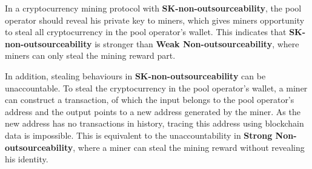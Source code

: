 In a cryptocurrency mining protocol with \textbf{SK-non-outsourceability}, the pool operator should reveal his private key to miners, which gives miners opportunity to steal all cryptocurrency in the pool operator's wallet.
This indicates that \textbf{SK-non-outsourceability} is stronger than \textbf{Weak Non-outsourceability}, where miners can only steal the mining reward part.

In addition, stealing behaviours in \textbf{SK-non-outsourceability} can be unaccountable.
To steal the cryptocurrency in the pool operator's wallet, a miner can construct a transaction, of which the input belongs to the pool operator's address and the output points to a new address generated by the miner.
As the new address has no transactions in history, tracing this address using blockchain data is impossible.
This is equivalent to the unaccountability in \textbf{Strong Non-outsourceability}, where a miner can steal the mining reward without revealing his identity.